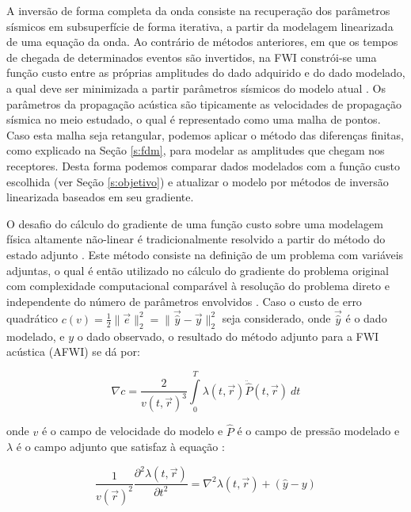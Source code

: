     A inversão de forma completa da onda consiste na recuperação dos parâmetros sísmicos em subsuperfície de forma iterativa, a partir da modelagem linearizada de uma equação da onda. Ao contrário de métodos anteriores, em que os tempos de chegada de determinados eventos são invertidos, na FWI constrói-se uma função custo entre as próprias amplitudes do dado adquirido e do dado modelado, a qual deve ser minimizada a partir \DIFdelbegin {}\DIFdelend \DIFaddbegin {}\DIFaddend parâmetros sísmicos do modelo atual . Os parâmetros da propagação acústica são tipicamente as velocidades de propagação sísmica no meio estudado, o qual é representado como uma malha de pontos. Caso esta malha seja retangular, podemos aplicar o método das diferenças finitas, como explicado na Seção \ref{s:fdm}, para modelar as amplitudes que chegam nos receptores. Desta forma podemos comparar dados modelados com a função custo escolhida (ver Seção \ref{s:objetivo}) e atualizar o modelo por métodos de inversão linearizada baseados em seu gradiente.

    O desafio do cálculo do gradiente de uma função custo sobre uma modelagem física altamente não-linear é tradicionalmente resolvido a partir do método do estado adjunto . Este método consiste na definição de um problema com variáveis adjuntas, o qual é então utilizado no cálculo do gradiente do problema original com complexidade computacional comparável à resolução do problema direto e independente do número de parâmetros envolvidos . Caso o custo de erro quadrático $c(v)=\frac{1}{2}\|\vec{e}\|_2^2=\|\vec{\hat{y}}-\vec{y} \|_2^2$ seja considerado, onde $\vec{\hat{y}}$ é o dado modelado, e $y$ o dado observado, o resultado do método adjunto para a FWI acústica (AFWI) se dá por:

    \begin{equation} \label{e:adjunto}
      \nabla c = \frac{2}{v(t,\vec{r})^3} \int \limits_0^{T} \lambda(t,\vec{r}) \ddot{\hat{P}}(t,\vec{r})\ dt
    \end{equation}

    \noindent onde $v$ é o campo de velocidade do modelo e $\hat{P}$ é o campo de pressão modelado e $\lambda$ é o campo adjunto que satisfaz à equação :

    \begin{equation} \label{e:adjunta}
      \frac{1}{v(\vec{r})^2} \frac{\partial^2 \lambda(t,\vec{r})}{\partial t^2} =
      \nabla^2 \lambda(t,\vec{r}) + (\hat{y} - y)
    \end{equation}

